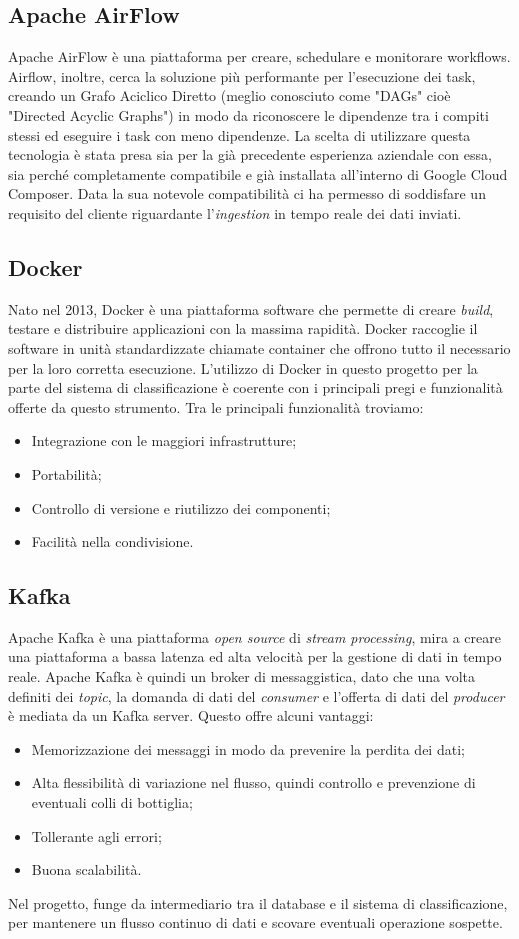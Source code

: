 \subsection{Apache AirFlow}
Apache AirFlow è una piattaforma per creare, schedulare e monitorare \gls{workflows}. Airflow, inoltre, cerca la soluzione più performante per l'esecuzione dei task, creando un Grafo Aciclico Diretto (meglio conosciuto come "\gls{DAGs}" cioè "Directed Acyclic Graphs") in modo da riconoscere le dipendenze tra i compiti stessi ed eseguire i task con meno dipendenze.
La scelta di utilizzare questa tecnologia è stata presa sia per la già precedente esperienza aziendale con essa, sia perché completamente compatibile e già installata all'interno di Google Cloud Composer. Data la sua notevole compatibilità ci ha permesso di soddisfare un requisito del cliente riguardante l'\emph{ingestion} in tempo reale dei dati inviati.
\subsection{Docker}
Nato nel 2013, Docker è una piattaforma software che permette di creare \emph{build}, testare e distribuire applicazioni con la massima rapidità. Docker raccoglie il software in unità standardizzate chiamate container che offrono tutto il necessario per la loro corretta esecuzione. L'utilizzo di Docker in questo progetto per la parte del sistema di classificazione è coerente con i principali pregi e funzionalità offerte da questo strumento.
Tra le principali funzionalità troviamo:
\begin{itemize}
	\item Integrazione con le maggiori infrastrutture;
	\item Portabilità;
	\item Controllo di versione e riutilizzo dei componenti;
	\item Facilità nella condivisione.
\end{itemize}
\subsection{Kafka}
Apache Kafka è una piattaforma \emph{open source} di \emph{stream processing}, mira a creare una piattaforma a bassa latenza ed alta velocità per la gestione di dati in tempo reale.
Apache Kafka è quindi un broker di messaggistica, dato che una volta definiti dei \emph{topic}, la domanda di dati del \emph{consumer} e l'offerta di dati del \emph{producer} è mediata da un Kafka server. Questo offre alcuni vantaggi:
\begin{itemize}
	\item Memorizzazione dei messaggi in modo da prevenire la perdita dei dati;
	\item Alta flessibilità di variazione nel flusso, quindi controllo e prevenzione di eventuali colli di bottiglia;
	\item Tollerante agli errori;
	\item Buona scalabilità.
\end{itemize}
Nel progetto, funge da intermediario tra il database e il sistema di classificazione, per mantenere un flusso continuo di dati e scovare eventuali operazione sospette.
